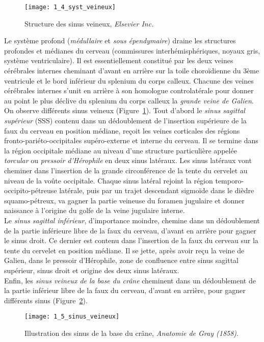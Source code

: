 \begin{figure}[!t]
\centering
\texttt{[image: 1\_4\_syst\_veineux]}
\caption{Structure des sinus veineux, {\em Elsevier Inc.} }
\label{fig:1_4_syst_veineux}	
\end{figure}
Le système profond ({\em médullaire} et {\em sous épendymaire}) draine les structures profondes et médianes du cerveau (commissures interhémisphériques, noyaux gris, système ventriculaire). Il est essentiellement constitué par les deux veines cérébrales internes cheminant d’avant en arrière sur la toile choroïdienne du 3ème ventricule et le bord inférieur du splenium du corps calleux. Chacune des veines cérébrales internes s’unit en arrière à son homologue controlatérale pour donner au point le plus déclive du splenium du corps calleux la {\em grande veine de Galien}.\\
On observe différents sinus veineux (Figure~\ref{fig:1_4_syst_veineux}). Tout d’abord le {\em sinus sagittal supérieur} (SSS) contenu dans un dédoublement de l’insertion supérieure de la faux du cerveau en position médiane, reçoit les veines corticales des régions fronto-pariéto-occipitales supéro-externe et interne du cerveau. Il se termine dans la région occipitale médiane au niveau d’une structure particulière appelée {\em torcular} ou {\em pressoir d’Hérophile} en deux sinus latéraux. Les sinus latéraux vont cheminer dans l’insertion de la grande circonférence de la tente du cervelet au niveau de la voûte occipitale. Chaque sinus latéral rejoint la région temporo-occipito-pétreuse latérale, puis par un trajet descendant sigmoïde dans le dièdre squamo-pétreux, va gagner la partie veineuse du foramen jugulaire et donner naissance à l’origine du golfe de la veine jugulaire interne.\\
Le {\em sinus sagittal inférieur}, d’importance moindre, chemine dans un dédoublement de la partie inférieure libre de la faux du cerveau, d’avant en arrière pour gagner le sinus droit. Ce dernier est contenu dans l’insertion de la faux du cerveau sur la tente du cervelet en position médiane. Il se jette, après avoir reçu la veine de Galien, dans le pressoir d’Hérophile, zone de confluence entre sinus sagittal supérieur, sinus droit et origine des deux sinus latéraux.\\
Enfin, les {\em sinus veineux de la base du crâne} cheminent dans un dédoublement de la partie inférieur libre de la faux du cerveau, d’avant en arrière, pour gagner différents sinus (Figure~\ref{fig:1_5_sinus_veineux}). 
\begin{figure}[!t]
\centering
\texttt{[image: 1\_5\_sinus\_veineux]}
\caption{Illustration des sinus de la base du cr\^ane, {\em Anatomie de Gray (1858)}. }
\label{fig:1_5_sinus_veineux}	
\end{figure}
